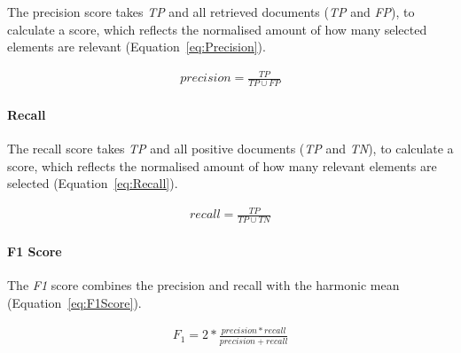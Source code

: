 The precision score takes \textit{TP} and all retrieved documents (\textit{TP} and \textit{FP}), to calculate a score, which reflects the normalised amount of how many selected elements are relevant (Equation~\ref{eq:Precision}).

\begin{equation} \label{eq:Precision}
\begin{gathered}
precision = \frac{TP}{TP \cup  FP}
\end{gathered}
\end{equation}

\paragraph{Recall}
\label{sub:recall}

The recall score takes \textit{TP} and all positive documents (\textit{TP} and \textit{TN}), to calculate a score, which reflects the normalised amount of how many relevant elements are selected (Equation~\ref{eq:Recall}).

\begin{equation} \label{eq:Recall}
\begin{gathered}
recall = \frac{TP}{TP \cup  TN}
\end{gathered}
\end{equation}

\paragraph{F1 Score}
\label{sub:F1Score}
The \textit{F1} score combines the precision and recall with the harmonic mean (Equation~\ref{eq:F1Score}).

\begin{equation} \label{eq:F1Score}
\begin{gathered}
F_{1} = 2 * \frac{precision * recall}{precision + recall}
\end{gathered}
\end{equation}

